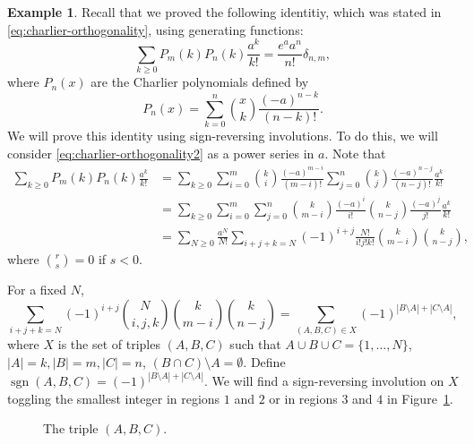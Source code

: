 \documentclass[oneside]{book}
\numberwithin{equation}{section}
\theoremstyle{definition}
\newtheorem{exam}[thm]{Example}
\newcommand\sgn{\operatorname{sgn}}
\begin{document}
\begin{exam}
  Recall that we proved the following identitiy, which was stated in
  \eqref{eq:charlier-orthogonality}, using generating functions:
  \begin{equation}\label{eq:charlier-orthogonality2}
  \sum_{k\ge 0}  P_m(k) P_n(k) \frac{a^k}{k!} = \frac{e^a a^n}{n!} \delta_{n,m},
  \end{equation}
  where \( P_n(x) \) are the Charlier polynomials defined by
  \[
    P_n(x) = \sum_{k=0}^{n} \binom{x}{k} \frac{(-a)^{n-k}}{(n-k)!}.
  \]
  We will prove this identity using sign-reversing involutions. To do
  this, we will consider \eqref{eq:charlier-orthogonality2} as a power
  series in \( a \). Note that
\begin{align*}
  \sum_{k\ge 0}  P_m(k) P_n(k) \frac{a^k}{k!}
  &=  \sum_{k\ge 0} \sum_{i=0}^m \binom{k}{i} \frac{(-a)^{m-i}}{(m-i)!}
  \sum_{j=0}^n \binom{k}{j} \frac{(-a)^{n-j}}{(n-j)!} \frac{a^k}{k!}\\
  &=  \sum_{k\ge 0} \sum_{i=0}^m \sum_{j=0}^n
    \binom{k}{m-i} \frac{(-a)^{i}}{i!}
   \binom{k}{n-j} \frac{(-a)^{j}}{j!} \frac{a^k}{k!}\\
  &= \sum_{N\ge0} \frac{a^N}{N!} \sum_{i+j+k=N}
  (-1)^{i+j} \frac{N!}{i!j!k!} \binom{k}{m-i} \binom{k}{n-j},
\end{align*}
where \( \binom{r}{s}=0 \) if \( s<0 \).

For a fixed \( N \),
\[
  \sum_{i+j+k=N} (-1)^{i+j} \binom{N}{i,j,k} \binom{k}{m-i} \binom{k}{n-j}
  = \sum_{(A,B,C)\in X} (-1)^{|B\setminus A| + |C\setminus A|},
\]
where \( X \) is the set of triples \( (A,B,C) \) such that
\( A\cup B\cup C = \{ 1,\dots,N \} \), \( |A|=k, |B|=m, |C|=n \),
\( (B\cap C)\setminus A = \emptyset \). Define
\( \sgn(A,B,C) = (-1)^{|B\setminus A| + |C\setminus A|} \). We will
find a sign-reversing involution on \( X \) toggling the smallest
integer in regions \( 1 \) and \( 2 \) or in regions \( 3 \) and
\( 4 \) in Figure~\ref{fig:image1}.
\begin{figure}
  \centering
{}
  \caption{The triple \( (A,B,C) \).}
  \label{fig:image1}
\end{figure}


\end{exam}
\end{document}
